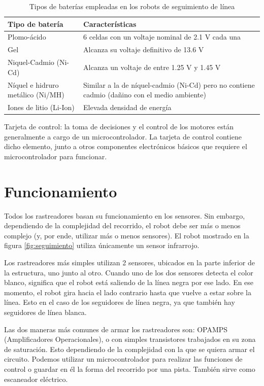 \documentclass[10pt,letterpaper]{article}
\begin{document}
\begin{table}[h]
	\begin{tabular}{lp{5cm}}
		\hline Tipo de batería &  Características\\ 
		\hline
		Plomo-ácido & 6 celdas con un voltaje nominal de 2.1 V cada una  \\ 
		Gel & Alcanza su voltaje definitivo de 13.6 V \\ 
		Niquel-Cadmio (Ni-Cd) & Alcanza un voltaje de entre 1.25 V y 1.45 V \\ 
		Níquel e hidruro metálico (Ni/MH) & Similar a la de níquel-cadmio (Ni-Cd) pero no contiene cadmio (dañino con el medio ambiente) \\ 
		Iones de litio (Li-Ion) & Elevada densidad de energía \\ 
		\hline 
	\end{tabular} 
	\caption{Tipos de baterías empleadas en los robots de seguimiento de línea}
	\label{tbl:baterias}
\end{table}	

Tarjeta de control: la toma de decisiones y el control de los motores están generalmente a cargo de un microcontrolador. La tarjeta de control contiene dicho elemento, junto a otros componentes electrónicos básicos que requiere el microcontrolador para funcionar.
	
\section{Funcionamiento}
Todos los rastreadores basan su funcionamiento en los sensores. Sin embargo, dependiendo de la complejidad del recorrido, el robot debe ser más o menos complejo (y, por ende, utilizar más o menos sensores). El robot mostrado en la figura \ref{fig:seguimiento} utiliza únicamente un sensor infrarrojo.

Los rastreadores más simples utilizan 2 sensores, ubicados en la parte inferior de la estructura, uno junto al otro. Cuando uno de los dos sensores detecta el color blanco, significa que el robot está saliendo de la línea negra por ese lado. En ese momento, el robot gira hacia el lado contrario hasta que vuelve a estar sobre la línea. Esto en el caso de los seguidores de línea negra, ya que también hay seguidores de línea blanca.

Las dos maneras más comunes de armar los rastreadores son: OPAMPS (Amplificadores Operacionales), o con simples transistores trabajados en su zona de saturación. Esto dependiendo de la complejidad con la que se quiera armar el circuito. Podemos utilizar un microcontrolador para realizar las funciones de control o guardar en él la forma del recorrido por una pista. También sirve como escaneador eléctrico.
\end{document}
